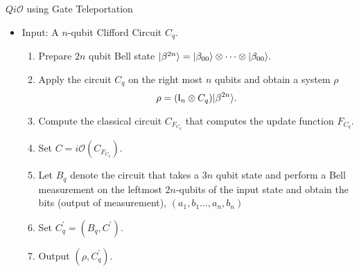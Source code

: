 \begin{algorithm}[H]
\label{QiO:Clifford-teleportation}
   \caption{$Qi\mathcal{O}$ using Gate Teleportation}
  \begin{itemize}
  \item Input: A $n$-qubit Clifford Circuit $C_q.$
  \begin{enumerate}
  \item Prepare $2n$ qubit Bell state ${\lvert}\beta^{ 2n}\rangle={\lvert}\beta_{00}\rangle\otimes \cdots \otimes {\lvert}\beta_{00}\rangle.$
  \item Apply the circuit $C_q$ on the right most $n$ qubits and obtain a system $\rho$
  										 $$\rho=({\sf I}_n\otimes C_q) {\lvert}\beta^{2n}\rangle.$$
 \item Compute the classical circuit $C_{F_{C_q}}$ that computes the update function $F_{C_q}.$	
 \item  Set $C=i\mathcal{O}(C_{F_{C_q}}).$							 
  \item Let $B_q$ denote the circuit that takes a $3n$ qubit state and perform a Bell measurement on the leftmost $2n$-qubits of the input state and obtain the bits (output of measurement), $(a_1,b_1\ldots,a_n,b_n)$ 
  \item Set $C_q^\prime=(B_q, C^\prime).$
  \item Output $\left(\rho,C_q^\prime \right).$
  \end{enumerate}
  \end{itemize}
\end{algorithm}


